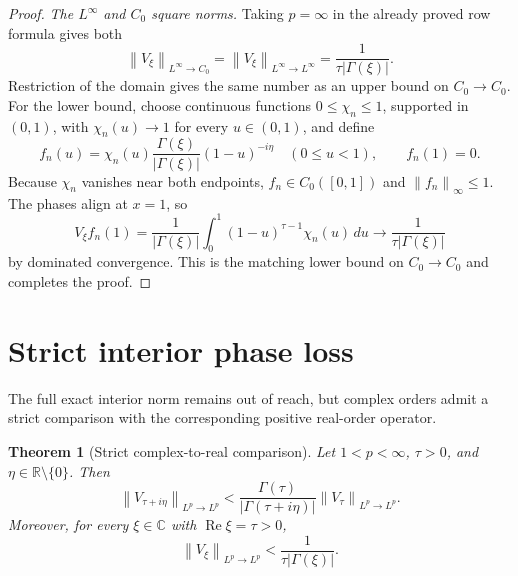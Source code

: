 \documentclass[11pt]{article}
\newcommand{\C}{\mathbb C}
\newcommand{\R}{\mathbb R}
\newcommand{\1}{\mathbf 1}
\newcommand{\norm}[1]{\left\lVert #1\right\rVert}
\newtheorem{theorem}{Theorem}
\begin{document}
\begin{proof}
\emph{The \(L^\infty\) and \(C_0\) square norms.}
Taking \(p=\infty\) in the already proved row formula gives both
\[
 \norm{V_\xi}_{L^\infty\to C_0}
 =\norm{V_\xi}_{L^\infty\to L^\infty}
 =\frac1{\tau|\Gamma(\xi)|}.
\]
Restriction of the domain gives the same number as an upper bound on
\(C_0\to C_0\).  For the lower bound, choose continuous functions
\(0\le\chi_n\le1\), supported in \((0,1)\), with
\(\chi_n(u)\to1\) for every \(u\in(0,1)\), and define
\[
 f_n(u)=\chi_n(u)\frac{\Gamma(\xi)}{|\Gamma(\xi)|}
 (1-u)^{-i\eta}\quad(0\le u<1),
 \qquad f_n(1)=0.
\]
Because \(\chi_n\) vanishes near both endpoints, \(f_n\in C_0([0,1])\)
and \(\norm{f_n}_\infty\le1\).  The phases align at \(x=1\), so
\[
 V_\xi f_n(1)
 =\frac1{|\Gamma(\xi)|}
 \int_0^1(1-u)^{\tau-1}\chi_n(u)\,du
 \longrightarrow\frac1{\tau|\Gamma(\xi)|}
\]
by dominated convergence.  This is the matching lower bound on
\(C_0\to C_0\) and completes the proof.
\end{proof}

\section{Strict interior phase loss}

The full exact interior norm remains out of reach, but complex orders admit a
strict comparison with the corresponding positive real-order operator.

\begin{theorem}[Strict complex-to-real comparison]\label{thm:strict}
Let \(1<p<\infty\), \(\tau>0\), and \(\eta\in\R\setminus\{0\}\).  Then
\begin{equation}\label{eq:strict-comparison}
 \norm{V_{\tau+i\eta}}_{L^p\to L^p}
 <\frac{\Gamma(\tau)}{|\Gamma(\tau+i\eta)|}
 \norm{V_\tau}_{L^p\to L^p}.
\end{equation}
Moreover, for every \(\xi\in\C\) with \(\operatorname{Re}\xi=\tau>0\),
\begin{equation}\label{eq:strict-young}
 \norm{V_\xi}_{L^p\to L^p}
 <\frac1{\tau|\Gamma(\xi)|}.
\end{equation}
\end{theorem}
\end{document}

